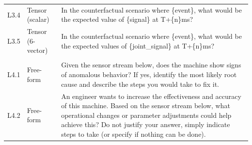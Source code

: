 \begin{small}
\begin{longtable}{@{}>{\centering\arraybackslash}p{}>{\raggedright\arraybackslash}p{}>{\raggedright\arraybackslash}p{}@{}}
        L3.4        & Tensor (scalar)        & In the counterfactual scenario where \{event\}, what would be the expected value of \{signal\} at T+\{n\}ms?                                                                                                                                                                                                                                                                                                                                                                                       \\
        L3.5        & Tensor (6-vector)      & In the counterfactual scenario where \{event\}, what would be the expected values of \{joint\_signal\} at T+\{n\}ms?                                                                                                                                                                                                                                                                                                                                                                               \\
        \midrule

        \multicolumn{3}{@{}l@{}}{\textbf{Level 4: Decision}}                                                                                                                                                                                                                                                                                                                                                                                                                                                                                      \\
        \midrule
        L4.1        & Free-form              & Given the sensor stream below, does the machine show signs of anomalous behavior? If yes, identify the most likely root cause and describe the steps you would take to fix it.                                                                                                                                                                                                                                                                                                                     \\
        L4.2        & Free-form              & An engineer wants to increase the effectiveness and accuracy of this machine. Based on the sensor stream below, what operational changes or parameter adjustments could help achieve this? Do not justify your answer, simply indicate steps to take (or specify if nothing can be done).                                                                                                                                                                                                          \\
    \end{longtable}
\end{small}

